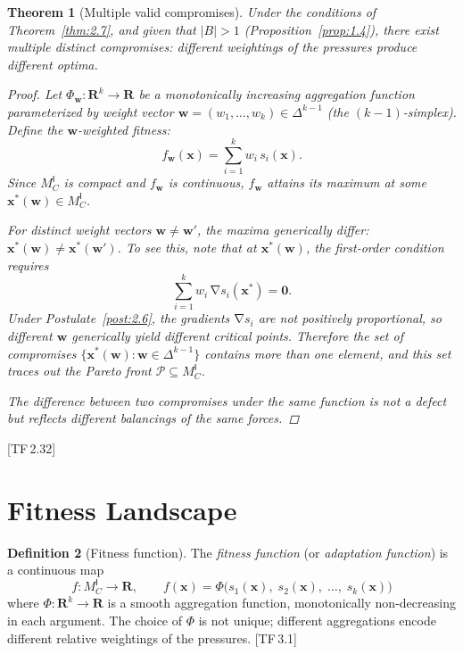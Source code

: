 \documentclass[11pt, a4paper]{article}
\theoremstyle{definition}
\newtheorem{definition}{Definition}[section]
\theoremstyle{plain}
\newtheorem{theorem}[definition]{Theorem}
\theoremstyle{remark}
\newcommand{\MC}{M^{\mathsf{I}}_C}          %
\providecommand{\R}{}
\renewcommand{\R}{\mathbf{R}}               %
\newcommand{\Pareto}{\mathcal{P}}            %
\newcommand{\abs}[1]{\lvert #1 \rvert}
\DeclareMathOperator{\grad}{\nabla}
\newcommand{\TF}[1]{\textnormal{[TF\,#1]}}  %
\begin{document}
\begin{theorem}[Multiple valid compromises]\label{thm:2.8}
Under the conditions of Theorem~\ref{thm:2.7}, and given that
$\abs{B} > 1$ (Proposition~\ref{prop:1.4}), there exist multiple
distinct compromises: different weightings of the pressures produce
different optima.

\begin{proof}
Let $\Phi_{\bm{w}} : \R^k \to \R$ be a monotonically increasing
aggregation function parameterized by weight vector
$\bm{w} = (w_1, \ldots, w_k) \in \Delta^{k-1}$ (the $(k{-}1)$-simplex).
Define the $\bm{w}$-weighted fitness:
\[
  f_{\bm{w}}(\bm{x}) = \sum_{i=1}^{k} w_i \, s_i(\bm{x}).
\]
Since $\MC$ is compact and $f_{\bm{w}}$ is continuous,
$f_{\bm{w}}$ attains its maximum at some
$\bm{x}^*(\bm{w}) \in \MC$.

For distinct weight vectors $\bm{w} \neq \bm{w}'$, the maxima
generically differ: $\bm{x}^*(\bm{w}) \neq \bm{x}^*(\bm{w}')$.
To see this, note that at $\bm{x}^*(\bm{w})$, the first-order
condition requires
\[
  \sum_{i=1}^k w_i \, \grad s_i(\bm{x}^*) = \bm{0}.
\]
Under Postulate~\ref{post:2.6}, the gradients $\grad s_i$ are not
positively proportional, so different $\bm{w}$ generically yield
different critical points. Therefore the set of compromises
$\{\bm{x}^*(\bm{w}) : \bm{w} \in \Delta^{k-1}\}$ contains more than
one element, and this set traces out the \emph{Pareto front}
$\Pareto \subseteq \MC$.

The difference between two compromises under the same function is not a
defect but reflects different balancings of the same forces. \qedhere
\end{proof}
\end{theorem}

\TF{2.32}

\newpage
\section{Fitness Landscape}\label{sec:landscape}

\begin{definition}[Fitness function]\label{def:3.1}
The \emph{fitness function} (or \emph{adaptation function}) is a
continuous map
\[
  f : \MC \longrightarrow \R, \qquad
  f(\bm{x}) = \Phi\bigl(s_1(\bm{x}),\; s_2(\bm{x}),\; \ldots,\;
  s_k(\bm{x})\bigr)
\]
where $\Phi : \R^k \to \R$ is a smooth aggregation function,
monotonically non-decreasing in each argument. The choice of $\Phi$
is not unique; different aggregations encode different relative weightings
of the pressures. \TF{3.1}
\end{definition}
\end{document}
